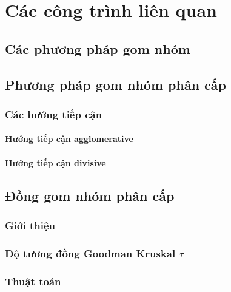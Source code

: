 \chapter{Các công trình liên quan}
\label{Chapter2}
\section{Các phương pháp gom nhóm}

\section{Phương pháp gom nhóm phân cấp}
\subsection{Các hướng tiếp cận}
\subsubsection{Hướng tiếp cận agglomerative}


\subsubsection{Hướng tiếp cận divisive}


\section{Đồng gom nhóm phân cấp}
\subsection{Giới thiệu}






\subsection{Độ tương đồng Goodman Kruskal $\tau$}




\subsection{Thuật toán}


